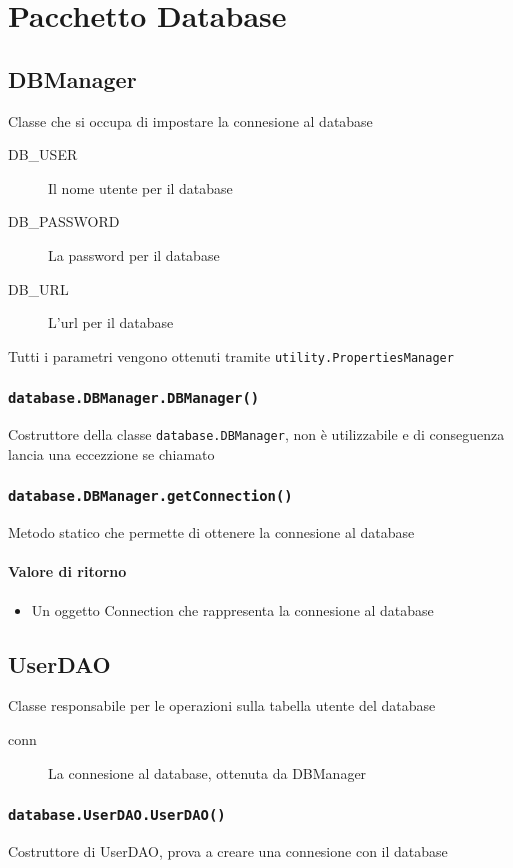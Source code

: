\section{Pacchetto Database}
\label{sec:package_database}

\subsection{DBManager}
Classe che si occupa di impostare la connesione al database
\begin{description}
\item[DB_USER]  Il nome utente per il database
\item[DB_PASSWORD] La password per il database
\item[DB_URL]  L'url per il database
\end{description}
Tutti i parametri vengono ottenuti tramite \texttt{utility.PropertiesManager}
\subsubsection{\texttt{database.DBManager.DBManager()}}
Costruttore della classe \texttt{database.DBManager}, non è utilizzabile e di conseguenza
lancia una eccezzione se chiamato

\subsubsection{\texttt{database.DBManager.getConnection()}}
Metodo statico che permette di ottenere la connesione al database
\paragraph{Valore di ritorno}
\begin{itemize}
\item Un oggetto Connection che rappresenta la connesione al database
\end{itemize}
    
\subsection{UserDAO} Classe responsabile per le operazioni sulla
tabella utente del database
\begin{description}
\item[conn] La connesione al database, ottenuta da DBManager
\end{description}

\subsubsection{\texttt{database.UserDAO.UserDAO()}}
Costruttore di UserDAO, prova a creare una connesione con il database

